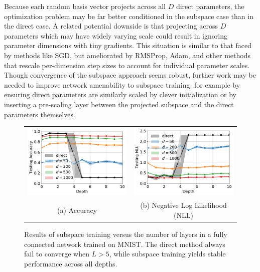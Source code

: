 \documentclass{article} %
\begin{document}
Because each random basis vector projects across all $D$ direct parameters, the optimization problem may be far better conditioned in the subspace case than in the direct case. A related potential downside is that projecting across $D$ parameters which may have widely varying scale could result in ignoring parameter dimensions with tiny gradients. This situation is similar to that faced by methods like SGD, but ameliorated by \mbox{RMSProp}, Adam, and other methods that rescale per-dimension step sizes to account for individual parameter scales. Though convergence of the subspace approach seems robust, further work may be needed to improve network amenability to subspace training: for example by ensuring direct parameters are similarly scaled by clever initialization or by inserting a pre-scaling layer between the projected subspace and the direct parameters themselves.


\begin{figure}[t] \centering
  \begin{tabular}{cc}
    \hspace{-0mm}
    \includegraphics[width=6.4cm]{acc_fnn_mnist_depth}
    &        \hspace{-4mm}
    \includegraphics[width=6.4cm]{nll_fnn_mnist_depth}
    \\
    \small{(a) Accuracy} &
    \small{(b) Negative Log Likelihood (NLL)}
  \end{tabular} \vspace{-2mm}
  \caption{Results of subspace training versus the number of layers in a fully connected network trained on MNIST. The direct method always fail to converge when $L>5$, while subspace training yields stable performance across all depths.}
  \vspace{-3mm}
\end{figure}
\end{document}
